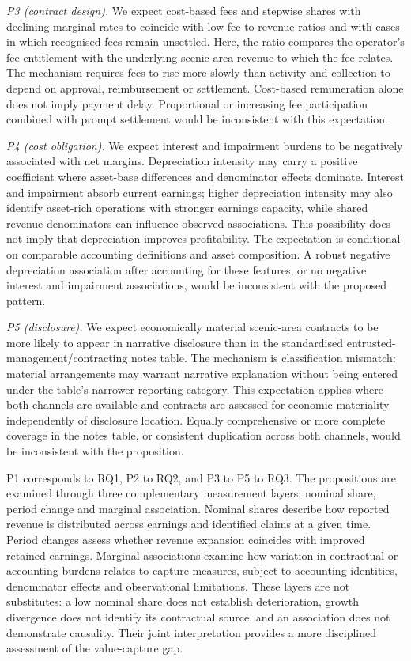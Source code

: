 \documentclass[review,3p,times]{elsarticle}
\begin{document}
\emph{P3 (contract design).} We expect cost-based fees and stepwise shares with declining marginal rates to coincide with low fee-to-revenue ratios and with cases in which recognised fees remain unsettled. Here, the ratio compares the operator's fee entitlement with the underlying scenic-area revenue to which the fee relates. The mechanism requires fees to rise more slowly than activity and collection to depend on approval, reimbursement or settlement. Cost-based remuneration alone does not imply payment delay. Proportional or increasing fee participation combined with prompt settlement would be inconsistent with this expectation.

\emph{P4 (cost obligation).} We expect interest and impairment burdens to be negatively associated with net margins. Depreciation intensity may carry a positive coefficient where asset-base differences and denominator effects dominate. Interest and impairment absorb current earnings; higher depreciation intensity may also identify asset-rich operations with stronger earnings capacity, while shared revenue denominators can influence observed associations. This possibility does not imply that depreciation improves profitability. The expectation is conditional on comparable accounting definitions and asset composition. A robust negative depreciation association after accounting for these features, or no negative interest and impairment associations, would be inconsistent with the proposed pattern.

\emph{P5 (disclosure).} We expect economically material scenic-area contracts to be more likely to appear in narrative disclosure than in the standardised entrusted-management/contracting notes table. The mechanism is classification mismatch: material arrangements may warrant narrative explanation without being entered under the table's narrower reporting category. This expectation applies where both channels are available and contracts are assessed for economic materiality independently of disclosure location. Equally comprehensive or more complete coverage in the notes table, or consistent duplication across both channels, would be inconsistent with the proposition.

P1 corresponds to RQ1, P2 to RQ2, and P3 to P5 to RQ3. The propositions are examined through three complementary measurement layers: nominal share, period change and marginal association. Nominal shares describe how reported revenue is distributed across earnings and identified claims at a given time. Period changes assess whether revenue expansion coincides with improved retained earnings. Marginal associations examine how variation in contractual or accounting burdens relates to capture measures, subject to accounting identities, denominator effects and observational limitations. These layers are not substitutes: a low nominal share does not establish deterioration, growth divergence does not identify its contractual source, and an association does not demonstrate causality. Their joint interpretation provides a more disciplined assessment of the value-capture gap.
\end{document}
